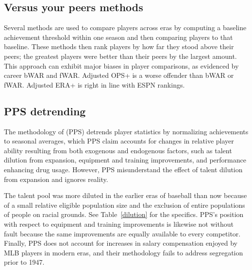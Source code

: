\documentclass[11pt]{article}\usepackage[]{graphicx}\usepackage[]{color}
\begin{document}
\subsection{Versus your peers methods}
\label{WARcritique}

Several methods are used to compare players across eras by computing a 
baseline achievement threshold within one season and then comparing players 
to that baseline. These methods then rank players by how far they stood 
above their peers; the greatest players were better than their peers by 
the largest amount. 
This approach can exhibit major biases in player comparisons, as evidenced by 
career bWAR and fWAR.   Adjusted OPS+ is a worse offender 
than bWAR or fWAR.  Adjusted ERA+ is right in line with ESPN rankings.




\subsection{PPS detrending}

The methodology of \citet{petersen} (PPS) detrends player statistics 
by normalizing achievements to seasonal averages, which PPS claim accounts 
for changes in relative player ability resulting from both exogenous and 
endogenous factors, such as talent dilution from expansion, equipment and 
training improvements, and performance enhancing drug usage. However, 
PPS misunderstand the effect of talent dilution from expansion and 
ignores reality.

The talent pool was more diluted in the earlier eras of 
baseball than now because of a small relative eligible population size and 
the exclusion of entire populations of people on racial grounds.  
See Table~\ref{dilution} for the specifics.  PPS's position with respect 
to equipment and training improvements is likewise not without fault 
because the same improvements are equally available to every competitor.  
Finally, PPS does not account for increases in salary compensation enjoyed by 
MLB players in modern eras, and their methodology fails to address 
segregation prior to 1947.
\end{document}
